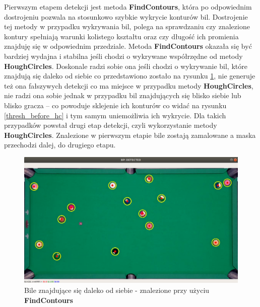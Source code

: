 \documentclass[12pt]{article}
\begin{document}
\begin{enumerate} [noitemsep]
    \vspace{0.5cm}

    Pierwszym etapem detekcji jest metoda \textbf{FindContours}, która po odpowiednim dostrojeniu pozwala na stosunkowo szybkie wykrycie konturów bil. Dostrojenie tej metody w przypadku wykrywania bil, polega na sprawdzaniu czy znalezione kontury spełniają warunki kolistego kształtu oraz czy długość ich promienia znajduję się w odpowiednim przedziale. Metoda \textbf{FindContours} okazała się być bardziej wydajna i stabilna jeśli chodzi o wykrywane współrzędne od metody \textbf{HoughCircles}. Doskonale radzi sobie ona jeśli chodzi o wykrywanie bil, które znajdują się daleko od siebie co przedstawiono zostało na rysunku \ref{bp_detected}, nie generuje też ona fałszywych detekcji co ma miejsce w przypadku metody \textbf{HoughCircles}, nie radzi ona sobie jednak w przypadku bil znajdujących się blisko siebie lub blisko gracza – co powoduje sklejenie ich konturów co widać na rysunku \ref{thresh_before_hc} i tym samym uniemożliwia ich wykrycie. Dla takich przypadków powstał drugi etap detekcji, czyli wykorzystanie metody \textbf{HoughCircles}. Znalezione w pierwszym etapie bile zostają zamalowane a maska przechodzi dalej, do drugiego etapu.

    \begin{figure}[!ht]
        \centering
        \includegraphics[width=15cm]{./images/obrazki/bp/bp_detected.png}
        \caption{Bile znajdujące się daleko od siebie - znalezione przy użyciu \textbf{FindContours}}
        \label{bp_detected}
    \end{figure}

    \newpage


\end{enumerate}
\end{document}

